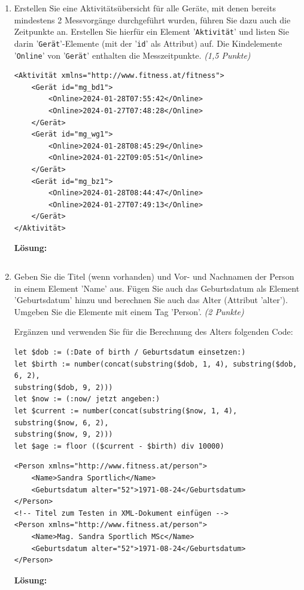 \documentclass[a4paper,11pt]{report}
\begin{document}
\begin{enumerate}[1.]
    \item Erstellen Sie eine Aktivitätsübersicht für alle Geräte, mit denen bereits mindestens 2
    Messvorgänge durchgeführt wurden, führen Sie dazu auch die Zeitpunkte an. 
    Erstellen Sie hierfür ein Element '\texttt{Aktivität}' und listen Sie darin '\texttt{Gerät}'-Elemente 
    (mit der '\texttt{id}' als Attribut) auf. 
    Die Kindelemente '\texttt{Online}' von '\texttt{Gerät}' enthalten die Messzeitpunkte. 
    \textit{(1,5 Punkte)}
    \begin{verbatim}
<Aktivität xmlns="http://www.fitness.at/fitness">
    <Gerät id="mg_bd1">
        <Online>2024-01-28T07:55:42</Online>
        <Online>2024-01-27T07:48:28</Online>
    </Gerät>
    <Gerät id="mg_wg1">
        <Online>2024-01-28T08:45:29</Online>
        <Online>2024-01-22T09:05:51</Online>
    </Gerät>
    <Gerät id="mg_bz1">
        <Online>2024-01-28T08:44:47</Online>
        <Online>2024-01-27T07:49:13</Online>
    </Gerät>
</Aktivität>
    \end{verbatim}
    \textbf{Lösung:}
    \inputminted[frame=lines, breaklines, linenos]{xquery}{assets/ue3_1_3.xq}

    \item Geben Sie die Titel (wenn vorhanden) und Vor- und Nachnamen der Person in einem Element 'Name' aus. 
    Fügen Sie auch das Geburtsdatum als Element 'Geburtsdatum' hinzu und 
    berechnen Sie auch das Alter (Attribut 'alter'). 
    Umgeben Sie die Elemente mit einem Tag 'Person'. \textit{(2 Punkte)}

    Ergänzen und verwenden Sie für die Berechnung des Alters folgenden Code:

    \begin{verbatim}
let $dob := (:Date of birth / Geburtsdatum einsetzen:)
let $birth := number(concat(substring($dob, 1, 4), substring($dob, 6, 2),
substring($dob, 9, 2)))
let $now := (:now/ jetzt angeben:)
let $current := number(concat(substring($now, 1, 4), substring($now, 6, 2),
substring($now, 9, 2)))
let $age := floor (($current - $birth) div 10000)
    \end{verbatim}

    \begin{verbatim}
<Person xmlns="http://www.fitness.at/person">
    <Name>Sandra Sportlich</Name>
    <Geburtsdatum alter="52">1971-08-24</Geburtsdatum>
</Person>
<!-- Titel zum Testen in XML-Dokument einfügen -->
<Person xmlns="http://www.fitness.at/person">
    <Name>Mag. Sandra Sportlich MSc</Name>
    <Geburtsdatum alter="52">1971-08-24</Geburtsdatum>
</Person>
    \end{verbatim}
    \textbf{Lösung:}
    \inputminted[frame=lines, breaklines, linenos]{xquery}{assets/ue3_1_4.xq}
    \newpage


\end{enumerate}
\end{document}
